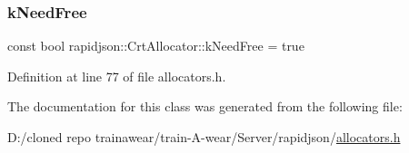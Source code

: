 \subsubsection{\texorpdfstring{kNeedFree}{kNeedFree}}
{\footnotesize\ttfamily const bool rapidjson\+::\+Crt\+Allocator\+::k\+Need\+Free = true\hspace{0.3cm}{\ttfamily [static]}}



Definition at line 77 of file allocators.\+h.



The documentation for this class was generated from the following file\+:\begin{DoxyCompactItemize}
\item 
D\+:/cloned repo trainawear/train-\/\+A-\/wear/\+Server/rapidjson/\mbox{\hyperlink{allocators_8h}{allocators.\+h}}\end{DoxyCompactItemize}
